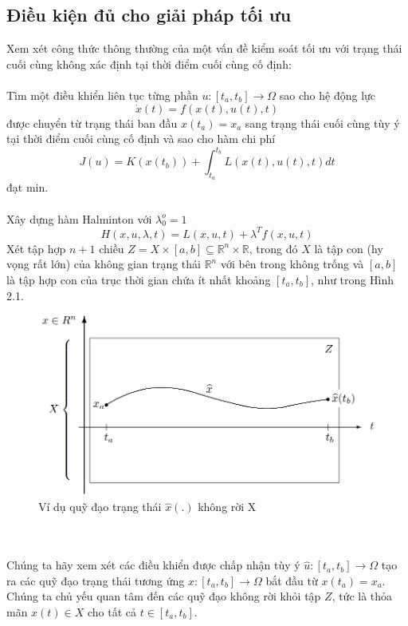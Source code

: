 \documentclass[12pt,a4paper]{report}
\begin{document}
	\subsection{Điều kiện đủ cho giải pháp tối ưu}
	Xem xét công thức thông thường của một vấn đề kiểm soát tối ưu với trạng thái cuối cùng không xác định tại thời điểm cuối cùng cố định: \\\\ Tìm một điều khiển liên tục từng phần $u : [t_a, t_b] \to \Omega$ sao cho hệ động lực $$\dot{x}(t) = f(x(t), u(t), t)$$ được chuyển từ trạng thái ban đầu $x(t_a) = x_a$ sang trạng thái cuối cùng tùy ý tại thời điểm cuối cùng cố định và sao cho hàm chi phí $$J(u) = K(x(t_b)) + \int_{t_a}^{t_b}L(x(t), u(t), t)dt$$ đạt min.\\\\
	Xây dựng hàm Halminton với $\lambda_0^o = 1$ $$H(x, u, \lambda, t) = L(x, u, t) + \lambda^Tf(x, u, t)$$
	Xét tập hợp $n + 1$ chiều $Z = X \times [a, b] \subseteq \mathbb{R}^n \times \mathbb{R}$, trong đó $X$ là tập con (hy vọng rất lớn) của không gian trạng thái $\mathbb{R}^n$ với bên trong không trống và $[a, b]$ là tập hợp con của trục thời gian chứa ít nhất khoảng $[t_a, t_b]$, như trong Hình 2.1.
	\begin{figure}[h]
		\centering
	  	\includegraphics[scale=.6]{hinh1ct.png}
		\caption{Ví dụ quỹ đạo trạng thái $\hat{x}(.)$ không rời X}
	\end{figure}\\\\
	Chúng ta hãy xem xét các điều khiển được chấp nhận tùy ý $\hat{u}: [t_a, t_b] \to \Omega$ tạo ra các quỹ đạo trạng thái tương ứng $\hat{x}: [t_a, t_b] \to \Omega$ bắt đầu từ $x(t_a) = x_a$. Chúng ta chủ yếu quan tâm đến các quỹ đạo không rời khỏi tập $Z$, tức là thỏa mãn $x(t) \in X$ cho tất cả $t \in [t_a, t_b]$. \\\\
\end{document}

